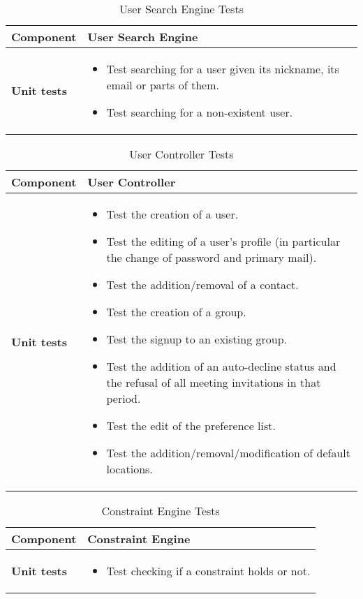 \begin{table}[H]	
	\centering
	\def\arraystretch{1.5}
	\begin{tabular}{|m{4cm}|m{12cm}|}
		\hline
		\textbf{Component} & User Search Engine \\ \hline
		\textbf{Unit tests} & 
			\begin{itemize}
			\item Test searching for a user given its nickname, its email or parts of them.
			\item Test searching for a non-existent user.
			\end{itemize} \\ \hline
	\end{tabular}
	\caption{User Search Engine Tests}
\end{table}

\begin{table}[H]	
	\centering
	\def\arraystretch{1.5}
	\begin{tabular}{|m{4cm}|m{12cm}|}
		\hline
		\textbf{Component} & User Controller \\ \hline
		\textbf{Unit tests} & 
			\begin{itemize}
			\item Test the creation of a user.
			\item Test the editing of a user's profile (in particular the change of password and primary mail).
			\item Test the addition/removal of a contact.
			\item Test the creation of a group.
			\item Test the signup to an existing group.
			\item Test the addition of an auto-decline status and the refusal of all meeting invitations in that period.
			\item Test the edit of the preference list.
			\item Test the addition/removal/modification of default locations.
			\end{itemize} \\ \hline
	\end{tabular}
	\caption{User Controller Tests}
\end{table}

\begin{table}[H]	
	\centering
	\def\arraystretch{1.5}
	\begin{tabular}{|m{4cm}|m{12cm}|}
		\hline
		\textbf{Component} & Constraint Engine \\ \hline
		\textbf{Unit tests} & 
			\begin{itemize}
			\item Test checking if a constraint holds or not.
			\end{itemize} \\ \hline
	\end{tabular}
	\caption{Constraint Engine Tests}
\end{table}

